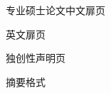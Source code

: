 \begin{figure}[!ht]
  \centering{}
  \caption{专业硕士论文中文扉页\label{fig:titlepage-msc2}}
\end{figure}

\begin{figure}[!ht]
  \centering
  \caption{英文扉页\label{fig:titlepage-en}}
\end{figure}

\begin{figure}[!ht]
  \centering
  \caption{独创性声明页\label{fig:copyright}}
\end{figure}

\begin{figure}[!ht]
  \centering
  \caption{摘要格式\label{fig:Abstract}}
\end{figure}

